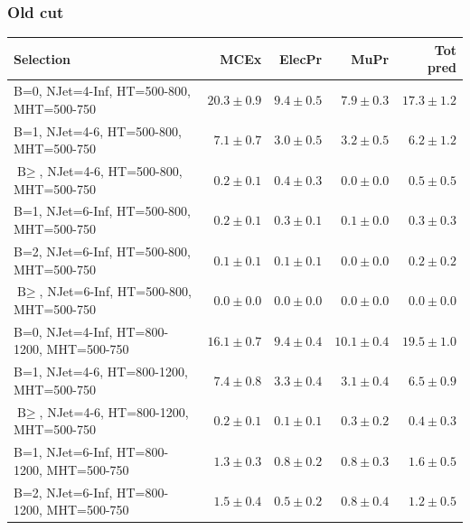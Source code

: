 \documentclass{beamer}
\begin{document}
\begin{frame}
\frametitle{Old \deltaphi cut}
\tiny
 \begin{tabular}{lrrrr}
\toprule
                                       Selection  &                     MCEx  &           ElecPr  &             MuPr  &          Tot pred  \\ 
\midrule
   B=0, NJet=4-Inf, HT=500-800, MHT=500-750 &              $20.3\pm0.9$&               $9.4\pm0.5$&               $7.9\pm0.3$&                  $17.3\pm1.2$ \\ 
      B=1, NJet=4-6, HT=500-800, MHT=500-750 &               $7.1\pm0.7$&               $3.0\pm0.5$&               $3.2\pm0.5$&                   $6.2\pm1.2$ \\ 
      $\text{B}\geq$, NJet=4-6, HT=500-800, MHT=500-750 &               $0.2\pm0.1$&               $0.4\pm0.3$&               $0.0\pm0.0$&                   $0.5\pm0.5$ \\ 
    B=1, NJet=6-Inf, HT=500-800, MHT=500-750 &               $0.2\pm0.1$&               $0.3\pm0.1$&               $0.1\pm0.0$&                   $0.3\pm0.3$ \\ 
    B=2, NJet=6-Inf, HT=500-800, MHT=500-750 &               $0.1\pm0.1$&               $0.1\pm0.1$&               $0.0\pm0.0$&                   $0.2\pm0.2$ \\ 
    $\text{B}\geq$, NJet=6-Inf, HT=500-800, MHT=500-750 &               $0.0\pm0.0$&               $0.0\pm0.0$&               $0.0\pm0.0$&                   $0.0\pm0.0$ \\ 
   B=0, NJet=4-Inf, HT=800-1200, MHT=500-750 &              $16.1\pm0.7$&               $9.4\pm0.4$&              $10.1\pm0.4$&                  $19.5\pm1.0$ \\ 
     B=1, NJet=4-6, HT=800-1200, MHT=500-750 &               $7.4\pm0.8$&               $3.3\pm0.4$&               $3.1\pm0.4$&                   $6.5\pm0.9$ \\ 
     $\text{B}\geq$, NJet=4-6, HT=800-1200, MHT=500-750 &               $0.2\pm0.1$&               $0.1\pm0.1$&               $0.3\pm0.2$&                   $0.4\pm0.3$ \\ 
   B=1, NJet=6-Inf, HT=800-1200, MHT=500-750 &               $1.3\pm0.3$&               $0.8\pm0.2$&               $0.8\pm0.3$&                   $1.6\pm0.5$ \\ 
   B=2, NJet=6-Inf, HT=800-1200, MHT=500-750 &               $1.5\pm0.4$&               $0.5\pm0.2$&               $0.8\pm0.4$&                   $1.2\pm0.5$ \\ 

\end{tabular}
\end{frame}
\end{document}

